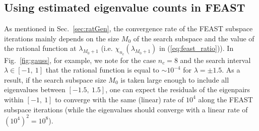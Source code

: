 \documentclass[12pt]{article}		\usepackage{tabls,multirow}
\begin{document}
\subsection{Using estimated eigenvalue counts in  FEAST}
As mentioned in Sec.~\ref{sec:ratGen}, the convergence rate of the
FEAST subspace iterations mainly depends on the size $M_0$ of the
search subspace and the value of the rational function at
$\lambda_{M_0+1}$ (i.e.  $\chi_{n_c}(\lambda_{M_0+1})$ in
(\ref{eq:feast_ratio})).
In Fig.~\ref{fig:gauss}, for example, we note for the case $n_c = 8$
and the search interval $\lambda\in[-1, \ 1]$ that the rational
function is equal to $\sim 10^{-4}$ for $\lambda = \pm1.5$.  As a
result, if the search subspace size $M_0$ is taken large enough to
include all eigenvalues between $[-1.5, \ 1.5]$, one can expect the
residuals of the eigenpairs within $[-1, \ 1]$ to converge with the
same (linear) rate of $10^{4}$ along the FEAST subspace iterations
(while the eigenvalues should converge with a linear rate of
$(10^{4})^2=10^{8}$).  
\end{document}
